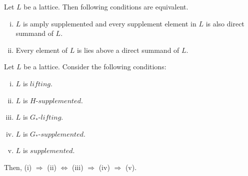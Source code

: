 \documentclass[handout]{beamer}
\begin{document}
\begin{frame}
    \begin{theorem} \label{4.2.11}
    Let $ L $ be a lattice. Then following conditions are equivalent.
        \begin{enumerate}[(i)]
            \item
                $ L $ is amply supplemented and every supplement element in $ L $ is also direct summand of $ L $.
            \item
                Every element of $ L $ is lies above a direct summand of $ L $.
        \end{enumerate}
    \end{theorem}
\end{frame}


\begin{frame}
    \begin{theorem} \label{4.2.12}
    Let $ L $ be a lattice. Consider the following conditions:
     \begin{enumerate}[(i)]
            \item
                $ L $ is $ lifting $.
            \item
                $ L $ is $ H $-$ supplemented $.
            \item
                $ L $ is $ G_* $-$ lifting $.
            \item
                $ L $ is $ G_* $-$ supplemented $.
            \item
                $ L $ is $ supplemented $.
        \end{enumerate}
        Then, (i) $ \Rightarrow $ (ii) $ \Leftrightarrow $ (iii) $ \Rightarrow $ (iv) $ \Rightarrow $ (v).
    \end{theorem}
\end{frame}
\end{document}
